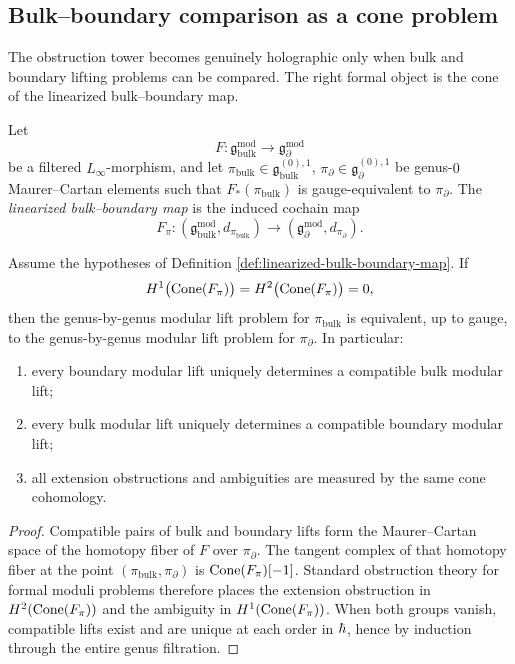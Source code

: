 \subsection{Bulk--boundary comparison as a cone problem}

The obstruction tower becomes genuinely holographic only when bulk and boundary lifting
problems can be compared. The right formal object is the cone of the linearized
bulk--boundary map.

\begin{definition}
Let
\[
F:\mathfrak g^{\mathrm{mod}}_{\mathrm{bulk}}\longrightarrow \mathfrak g^{\mathrm{mod}}_{\partial}
\]
be a filtered $L_\infty$-morphism, and let
$\pi_{\mathrm{bulk}}\in\mathfrak g_{\mathrm{bulk}}^{(0),1}$,
$\pi_\partial\in\mathfrak g_\partial^{(0),1}$
be genus-$0$ Maurer--Cartan elements such that $F_*(\pi_{\mathrm{bulk}})$ is gauge-equivalent to
$\pi_\partial$. The \emph{linearized bulk--boundary map} is the induced cochain map
\[
F_\pi:(\mathfrak g^{\mathrm{mod}}_{\mathrm{bulk}},d_{\pi_{\mathrm{bulk}}})
\longrightarrow
(\mathfrak g^{\mathrm{mod}}_{\partial},d_{\pi_\partial}).
\]
\end{definition}

\begin{theorem}
Assume the hypotheses of Definition \ref{def:linearized-bulk-boundary-map}. If
\[
H^1\bigl(\operatorname{Cone}(F_\pi)\bigr)=H^2\bigl(\operatorname{Cone}(F_\pi)\bigr)=0,
\]
then the genus-by-genus modular lift problem for $\pi_{\mathrm{bulk}}$ is equivalent, up to gauge,
to the genus-by-genus modular lift problem for $\pi_\partial$. In particular:
\begin{enumerate}[label=\textup{(\roman*)}]
\item every boundary modular lift uniquely determines a compatible bulk modular lift;
\item every bulk modular lift uniquely determines a compatible boundary modular lift;
\item all extension obstructions and ambiguities are measured by the same cone cohomology.
\end{enumerate}
\end{theorem}

\begin{proof}
Compatible pairs of bulk and boundary lifts form the Maurer--Cartan space of the homotopy
fiber of $F$ over $\pi_\partial$. The tangent complex of that homotopy fiber at the point
$(\pi_{\mathrm{bulk}},\pi_\partial)$ is $\operatorname{Cone}(F_\pi)[-1]$. Standard obstruction theory for formal
moduli problems therefore places the extension obstruction in
$H^2(\operatorname{Cone}(F_\pi))$ and the ambiguity in $H^1(\operatorname{Cone}(F_\pi))$. When both groups vanish,
compatible lifts exist and are unique at each order in $\hbar$, hence by induction through the
entire genus filtration.
\end{proof}

